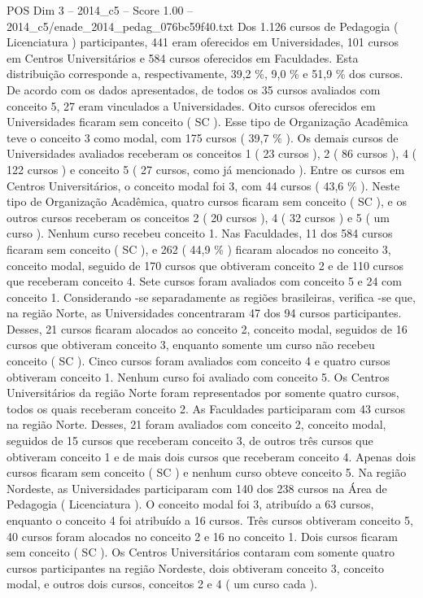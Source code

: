 \begin{textsample}{POS Dim 3 – 2014\_c5 – Score 1.00 – 2014\_c5/enade\_2014\_pedag\_076bc59f40.txt}
Dos 1.126 cursos de Pedagogia ( Licenciatura ) participantes, 441 eram oferecidos em Universidades, 101 cursos em Centros Universitários e 584 cursos oferecidos em Faculdades.
Esta distribuição corresponde a, respectivamente, 39,2 \%, 9,0 \% e 51,9 \% dos cursos.
De acordo com os dados apresentados, de todos os 35 cursos avaliados com conceito 5, 27 eram vinculados a Universidades.
Oito cursos oferecidos em Universidades ficaram sem conceito ( SC ).
Esse tipo de Organização Acadêmica teve o conceito 3 como modal, com 175 cursos ( 39,7 \% ).
Os demais cursos de Universidades avaliados receberam os conceitos 1 ( 23 cursos ), 2 ( 86 cursos ), 4 ( 122 cursos ) e conceito 5 ( 27 cursos, como já mencionado ).
Entre os cursos em Centros Universitários, o conceito modal foi 3, com 44 cursos ( 43,6 \% ).
Neste tipo de Organização Acadêmica, quatro cursos ficaram sem conceito ( SC ), e os outros cursos receberam os conceitos 2 ( 20 cursos ), 4 ( 32 cursos ) e 5 ( um curso ).
Nenhum curso recebeu conceito 1.
Nas Faculdades, 11 dos 584 cursos ficaram sem conceito ( SC ), e 262 ( 44,9 \% ) ficaram alocados no conceito 3, conceito modal, seguido de 170 cursos que obtiveram conceito 2 e de 110 cursos que receberam conceito 4.
Sete cursos foram avaliados com conceito 5 e 24 com conceito 1.
Considerando -se separadamente as regiões brasileiras, verifica -se que, na região Norte, as Universidades concentraram 47 dos 94 cursos participantes.
Desses, 21 cursos ficaram alocados ao conceito 2, conceito modal, seguidos de 16 cursos que obtiveram conceito 3, enquanto somente um curso não recebeu conceito ( SC ).
Cinco cursos foram avaliados com conceito 4 e quatro cursos obtiveram conceito 1.
Nenhum curso foi avaliado com conceito 5.
Os Centros Universitários da região Norte foram representados por somente quatro cursos, todos os quais receberam conceito 2.
As Faculdades participaram com 43 cursos na região Norte.
Desses, 21 foram avaliados com conceito 2, conceito modal, seguidos de 15 cursos que receberam conceito 3, de outros três cursos que obtiveram conceito 1 e de mais dois cursos que receberam conceito 4.
Apenas dois cursos ficaram sem conceito ( SC ) e nenhum curso obteve conceito 5.
Na região Nordeste, as Universidades participaram com 140 dos 238 cursos na Área de Pedagogia ( Licenciatura ).
O conceito modal foi 3, atribuído a 63 cursos, enquanto o conceito 4 foi atribuído a 16 cursos.
Três cursos obtiveram conceito 5, 40 cursos foram alocados no conceito 2 e 16 no conceito 1.
Dois cursos ficaram sem conceito ( SC ).
Os Centros Universitários contaram com somente quatro cursos participantes na região Nordeste, dois obtiveram conceito 3, conceito modal, e outros dois cursos, conceitos 2 e 4 ( um curso cada ).

\end{textsample}
